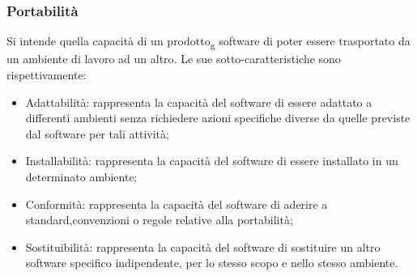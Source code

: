 \subsubsection{Portabilità}
Si intende quella capacità di un prodotto\textsubscript{g} software di poter essere trasportato da un ambiente di lavoro ad un altro. 
Le sue sotto-caratteristiche sono rispettivamente:
\begin{itemize}
\item Adattabilità: rappresenta la capacità del software di essere adattato a differenti ambienti senza richiedere azioni specifiche diverse da quelle previste dal software per tali attività;
\item Installabilità: rappresenta la capacità del software di essere installato in un determinato ambiente;
\item Conformità: rappresenta la capacità del software di aderire a standard,convenzioni o regole relative alla portabilità;
\item Sostituibilità: rappresenta la capacità del software di sostituire un altro software specifico indipendente, per lo stesso scopo e nello stesso ambiente.
\end{itemize}